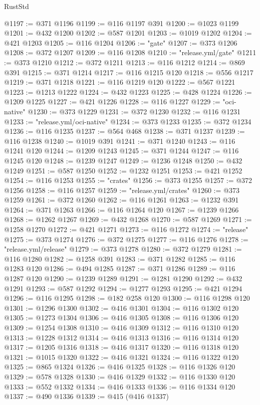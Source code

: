 \begin{lexlean}{RustStd}
\begin{coremodule}
@1197 := @371 @1196
@1199 := @116 @1197 @391
@1200 := @1023 @1199
@1201 := @432 @1200
@1202 := @587 @1201
@1203 := @1019 @1202
@1204 := @421 @1203
@1205 := @116 @1204
@1206 := "gate"
@1207 := @373 @1206
@1208 := @372 @1207
@1209 := @116 @1208
@1210 := "release.yml/gate"
@1211 := @373 @1210
@1212 := @372 @1211
@1213 := @116 @1212
@1214 := @869 @391
@1215 := @371 @1214
@1217 := @116 @1215 @120
@1218 := @556 @1217
@1219 := @371 @1218
@1221 := @116 @1219 @120
@1222 := @567 @1221
@1223 := @1213 @1222
@1224 := @432 @1223
@1225 := @428 @1224
@1226 := @1209 @1225
@1227 := @421 @1226
@1228 := @116 @1227
@1229 := "oci-native"
@1230 := @373 @1229
@1231 := @372 @1230
@1232 := @116 @1231
@1233 := "release.yml/oci-native"
@1234 := @373 @1233
@1235 := @372 @1234
@1236 := @116 @1235
@1237 := @564 @468
@1238 := @371 @1237
@1239 := @116 @1238
@1240 := @1019 @391
@1241 := @371 @1240
@1243 := @116 @1241 @120
@1244 := @1209 @1243
@1245 := @371 @1244
@1247 := @116 @1245 @120
@1248 := @1239 @1247
@1249 := @1236 @1248
@1250 := @432 @1249
@1251 := @587 @1250
@1252 := @1232 @1251
@1253 := @421 @1252
@1254 := @116 @1253
@1255 := "crates"
@1256 := @373 @1255
@1257 := @372 @1256
@1258 := @116 @1257
@1259 := "release.yml/crates"
@1260 := @373 @1259
@1261 := @372 @1260
@1262 := @116 @1261
@1263 := @1232 @391
@1264 := @371 @1263
@1266 := @116 @1264 @120
@1267 := @1239 @1266
@1268 := @1262 @1267
@1269 := @432 @1268
@1270 := @587 @1269
@1271 := @1258 @1270
@1272 := @421 @1271
@1273 := @116 @1272
@1274 := "release"
@1275 := @373 @1274
@1276 := @372 @1275
@1277 := @116 @1276
@1278 := "release.yml/release"
@1279 := @373 @1278
@1280 := @372 @1279
@1281 := @116 @1280
@1282 := @1258 @391
@1283 := @371 @1282
@1285 := @116 @1283 @120
@1286 := @494 @1285
@1287 := @371 @1286
@1289 := @116 @1287 @120
@1290 := @1239 @1289
@1291 := @1281 @1290
@1292 := @432 @1291
@1293 := @587 @1292
@1294 := @1277 @1293
@1295 := @421 @1294
@1296 := @116 @1295
@1298 := @182 @258 @120
@1300 := @116 @1298 @120
@1301 := @1296 @1300
@1302 := @416 @1301
@1304 := @116 @1302 @120
@1305 := @1273 @1304
@1306 := @416 @1305
@1308 := @116 @1306 @120
@1309 := @1254 @1308
@1310 := @416 @1309
@1312 := @116 @1310 @120
@1313 := @1228 @1312
@1314 := @416 @1313
@1316 := @116 @1314 @120
@1317 := @1205 @1316
@1318 := @416 @1317
@1320 := @116 @1318 @120
@1321 := @1015 @1320
@1322 := @416 @1321
@1324 := @116 @1322 @120
@1325 := @865 @1324
@1326 := @416 @1325
@1328 := @116 @1326 @120
@1329 := @578 @1328
@1330 := @416 @1329
@1332 := @116 @1330 @120
@1333 := @552 @1332
@1334 := @416 @1333
@1336 := @116 @1334 @120
@1337 := @490 @1336
@1339 := @415 (@416 @1337)

\end{coremodule}
\end{lexlean}
